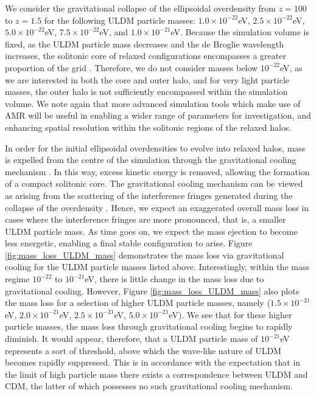 \documentclass[a4paper,11pt]{article}
\begin{document}
We consider the gravitational collapse of the ellipsoidal overdensity from $z=100$ to $z=1.5$ for the following ULDM particle masses: $1.0\times 10^{-22}$eV, $2.5\times 10^{-22}$eV, $5.0\times 10^{-22}$eV, $7.5\times 10^{-22}$eV, and $1.0 \times 10^{-21}$eV. Because the simulation volume is fixed, as the ULDM particle mass decreases and the de Broglie wavelength increases, the solitonic core of relaxed configurations encompasses a greater proportion of the grid \cite{Kendall:2019fep}. Therefore, we do not consider masses below $10^{-22}$eV, as we are interested in both the core and outer halo, and for very light particle masses, the outer halo is not sufficiently encompassed within the simulation volume. We note again that more advanced simulation tools which make use of AMR will be useful in enabling a wider range of parameters for investigation, and enhancing spatial resolution within the solitonic regions of the relaxed halos. 

In order for the initial ellipsoidal overdensities to evolve into relaxed halos, mass is expelled from the centre of the simulation through the gravitational cooling mechanism \cite{Seidel:1993zk, Guzman:2006yc}. In this way, excess kinetic energy is removed, allowing the formation of a compact solitonic core. The gravitational cooling mechanism can be viewed as arising from the scattering of the interference fringes generated during the collapse of the overdensity \cite{Arvanitaki:2019rax}. Hence, we expect an exaggerated overall mass loss in cases where the interference fringes are more pronounced, that is, a smaller ULDM particle mass. As time goes on, we expect the mass ejection to become less energetic, enabling a final stable configuration to arise. Figure \ref{fig:mass_loss_ULDM_mass} demonstrates the mass loss via gravitational cooling for the ULDM particle masses listed above. Interestingly, within the mass regime $10^{-22}$ to $10^{-21}$eV, there is little change in the mass loss due to gravitational cooling. However, Figure \ref{fig:mass_loss_ULDM_mass} also plots the mass loss for a selection of higher ULDM particle masses, namely ($1.5\times 10^{-21}$eV, $2.0\times 10^{-21}$eV, $2.5\times 10^{-21}$eV, $5.0\times 10^{-21}$eV). We see that for these higher particle masses, the mass loss through gravitational cooling begins to rapidly diminish. It would appear, therefore, that a ULDM particle mass of $10^{-21}$eV represents a sort of threshold, above which the wave-like nature of ULDM becomes rapidly suppressed. This is in accordance with the expectation that in the limit of high particle mass there exists a correspondence between ULDM and CDM, the latter of which possesses no such gravitational cooling mechanism.
\end{document}

